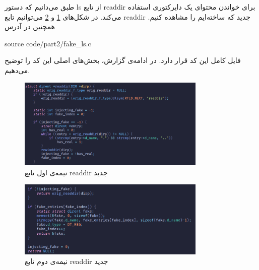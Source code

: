\documentclass[12pt]{article}
\begin{document}
        طبق
        \cite{gnu-coreutils-ls}
        می‌دانیم که دستور
        \textenglish{ls}
        از تابع
        \textenglish{readdir}
        برای خواندن محتوای یک دایرکتوری استفاده می‌کند.
        در شکل‌های 
        \ref{im8}
        و 
        \ref{im9}
        می‌توانیم تابع 
        \textenglish{readdir}
        جدید که ساخته‌ایم را مشاهده کنیم. همچنین در آدرس
        
        \begin{english}
            source code/part2/fake\_ls.c
        \end{english}

        \noindent
        فایل کامل این کد قرار دارد. در ادامه‌ی گزارش، بخش‌های اصلی این کد را توضیح می‌دهیم.

        \begin{figure}[H]
		\centering
		\includegraphics[width=0.8\textwidth]{report8-resources/8.png}
		\caption{نیمه‌ی اول تابع \textenglish{readdir} جدید}
            \label{im8}
	\end{figure}

        \begin{figure}[H]
		\centering
		\includegraphics[width=0.8\textwidth]{report8-resources/9.png}
		\caption{نیمه‌ی دوم تابع \textenglish{readdir} جدید}
            \label{im9}
	\end{figure}
\end{document}
